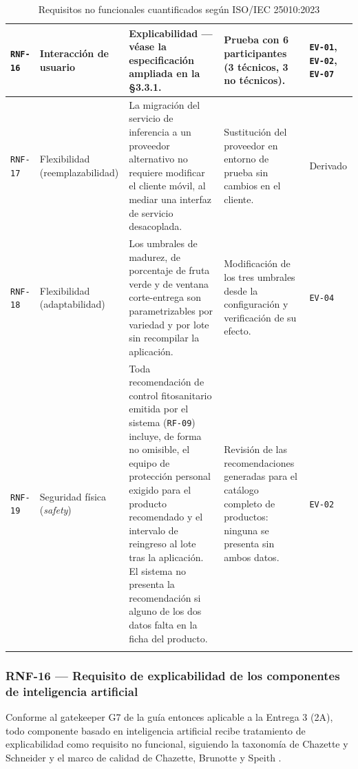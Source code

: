 \documentclass[11pt,a4paper]{article}
\newcommand{\id}[1]{\texttt{\begingroup\hyphenpenalty=10000\relax#1\endgroup}}
\renewcommand{\id}[1]{\texttt{#1}}
\begin{document}
{\begin{longtable}{|C{1.2cm}|L{2.4cm}|L{5.8cm}|L{3.1cm}|L{2.2cm}|}
\id{RNF-16} & Interacción de usuario & \textbf{Explicabilidad} --- véase la especificación ampliada en la §3.3.1. & Prueba con 6 participantes (3 técnicos, 3 no técnicos). & \footnotesize \id{EV-01}, \id{EV-02}, \id{EV-07} \\ \hline
\id{RNF-17} & Flexibilidad \newline \footnotesize(reemplazabilidad) & La migración del servicio de inferencia a un proveedor alternativo no requiere modificar el cliente móvil, al mediar una interfaz de servicio desacoplada. & Sustitución del proveedor en entorno de prueba sin cambios en el cliente. & \footnotesize Derivado \\ \hline
\id{RNF-18} & Flexibilidad \newline \footnotesize(adaptabilidad) & Los umbrales de madurez, de porcentaje de fruta verde y de ventana corte-entrega son parametrizables por variedad y por lote sin recompilar la aplicación. & Modificación de los tres umbrales desde la configuración y verificación de su efecto. & \footnotesize \id{EV-04} \\ \hline
\id{RNF-19} & Seguridad física \newline \footnotesize(\emph{safety}) & Toda recomendación de control fitosanitario emitida por el sistema (\id{RF-09}) incluye, de forma no omisible, el equipo de protección personal exigido para el producto recomendado y el intervalo de reingreso al lote tras la aplicación. El sistema no presenta la recomendación si alguno de los dos datos falta en la ficha del producto. & Revisión de las recomendaciones generadas para el catálogo completo de productos: ninguna se presenta sin ambos datos. & \footnotesize \id{EV-02} \\ \hline
\caption{Requisitos no funcionales cuantificados según ISO/IEC 25010:2023}
\end{longtable}}

\subsubsection{RNF-16 --- Requisito de explicabilidad de los componentes de inteligencia artificial}

Conforme al gatekeeper G7 de la guía entonces aplicable a la Entrega 3 (2A), todo componente basado en inteligencia
artificial recibe tratamiento de explicabilidad como requisito no funcional, siguiendo la taxonomía
de Chazette y Schneider \cite{chazette2020} y el marco de calidad de Chazette, Brunotte y Speith
\cite{chazette2021,chazette2022}.
\end{document}
